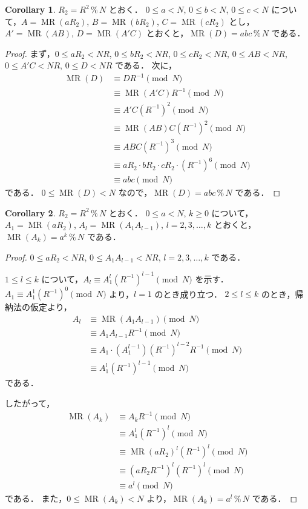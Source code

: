 \documentclass[twocolumn, uplatex, dvipdfmx]{jsarticle}
\renewcommand{\ge}{\geqslant}
\renewcommand{\le}{\leqslant}
\numberwithin{equation}{section}
\theoremstyle{definition}
\newtheorem{cor}{Corollary}[section]
\newcommand{\Mod}{\,\texttt{\%}\,}
\DeclareMathOperator{\MR}{\mathrm{MR}}
\begin{document}
\begin{cor}
	$R_2=R^2\Mod N$ とおく．
	$0\le a<N$, $0\le b<N$, $0\le c<N$ について，$A=\MR(aR_2)$, $B=\MR(bR_2)$, $C=\MR(cR_2)$ とし，$A'=\MR(AB)$, $D=\MR(A'C)$ とおくと，$\MR(D)=abc\Mod N$ である．
\end{cor}
\begin{proof}
	まず，$0\le aR_2<NR$, $0\le bR_2<NR$, $0\le cR_2<NR$, $0\le AB<NR$, $0\le A'C<NR$, $0\le D<NR$ である．
	次に，
	\begin{align*}
		\MR(D)&\equiv DR^{-1}\pmod{N}\\
		&\equiv \MR(A'C)R^{-1}\pmod{N}\\
		&\equiv A'C(R^{-1})^2\pmod{N}\\
		&\equiv \MR(AB)C(R^{-1})^2\pmod{N}\\
		&\equiv ABC(R^{-1})^3\pmod{N}\\
		&\equiv aR_2\cdot bR_2\cdot cR_2\cdot(R^{-1})^6\pmod{N}\\
		&\equiv abc\pmod{N}
	\end{align*}
	である．
	$0\le\MR(D)<N$ なので，$\MR(D)=abc\Mod N$ である．
\end{proof}

\begin{cor}
	$R_2=R^2\Mod N$ とおく．
	$0\le a<N$, $k\ge0$ について，
	$A_1=\MR(aR_2)$, $A_l=\MR(A_1A_{l-1})$, $l=2,3,\dots,k$ とおくと，$\MR(A_k)=a^k\Mod N$ である．
\end{cor}
\begin{proof}
	$0\le aR_2<NR$, $0\le A_1A_{l-1}<NR$, $l=2,3,\dots,k$ である．

	$1\le l\le k$ について，$A_l\equiv A_1^l(R^{-1})^{l-1}\pmod{N}$ を示す．
	$A_1\equiv A_1^1(R^{-1})^0\pmod{N}$ より，$l=1$ のとき成り立つ．
	$2\le l\le k$ のとき，帰納法の仮定より，
	\begin{align*}
		A_l&\equiv\MR(A_1A_{l-1})\pmod{N}\\
		&\equiv A_1A_{l-1}R^{-1}\pmod{N}\\
		&\equiv A_1\cdot (A_1^{l-1})(R^{-1})^{l-2}R^{-1}\pmod{N}\\
		&\equiv A_1^l(R^{-1})^{l-1}\pmod{N}
	\end{align*}
	である．

	したがって，
	\begin{align*}
		\MR(A_k)&\equiv A_kR^{-1}\pmod{N}\\
		&\equiv A_1^l(R^{-1})^l\pmod{N}\\
		&\equiv \MR(aR_2)^l(R^{-1})^l\pmod{N}\\
		&\equiv (aR_2R^{-1})^l(R^{-1})^l\pmod{N}\\
		&\equiv a^l\pmod{N}
	\end{align*}
	である．
	また，$0\le\MR(A_k)<N$ より，$\MR(A_k)=a^l\Mod N$ である．
\end{proof}
\end{document}
